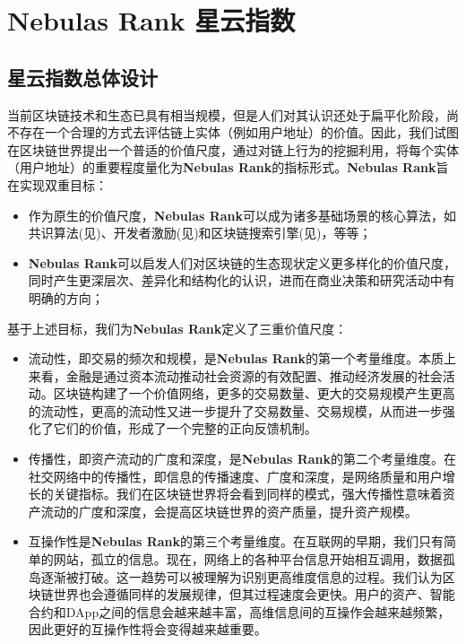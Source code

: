 \section{Nebulas Rank 星云指数}
\label{sec:rank}

\subsection{星云指数总体设计} \label{subsec:value}
当前区块链技术和生态已具有相当规模，但是人们对其认识还处于扁平化阶段，尚不存在一个合理的方式去评估链上实体（例如用户地址）的价值。因此，我们试图在区块链世界提出⼀个普适的价值尺度，通过对链上行为的挖掘利用，将每个实体（用户地址）的重要程度量化为\textbf{Nebulas Rank}的指标形式。\textbf{Nebulas Rank}旨在实现双重目标：
\begin{itemize}
	\item 作为原生的价值尺度，\textbf{Nebulas Rank}可以成为诸多基础场景的核心算法，如共识算法(见)、开发者激励(见)和区块链搜索引擎(见)，等等；
	\item \textbf{Nebulas Rank}可以启发人们对区块链的生态现状定义更多样化的价值尺度，同时产生更深层次、差异化和结构化的认识，进而在商业决策和研究活动中有明确的方向；
\end{itemize}
基于上述目标，我们为\textbf{Nebulas Rank}定义了三重价值尺度：
\begin{itemize}
	\item 流动性，即交易的频次和规模，是\textbf{Nebulas Rank}的第⼀个考量维度。本质上来看，⾦融是通过资本流动推动社会资源的有效配置、推动经济发展的社会活动。区块链构建了⼀个价值⽹络，更多的交易数量、更⼤的交易规模产⽣更⾼的流动性，更⾼的流动性⼜进⼀步提升了交易数量、交易规模，从⽽进⼀步强化了它们的价值，形成了⼀个完整的正向反馈机制。
	\item 传播性，即资产流动的⼴度和深度，是\textbf{Nebulas Rank}的第⼆个考量维度。在社交网络中的传播性，即信息的传播速度、⼴度和深度，是⽹络质量和⽤户增长的关键指标。我们在区块链世界将会看到同样的模式，强⼤传播性意味着资产流动的⼴度和深度，会提⾼区块链世界的资产质量，提升资产规模。
	\item 互操作性是\textbf{Nebulas Rank}的第三个考量维度。在互联⽹的早期，我们只有简单的⽹站，孤⽴的信息。现在，⽹络上的各种平台信息开始相互调⽤，数据孤岛逐渐被打破。这⼀趋势可以被理解为识别更⾼维度信息的过程。我们认为区块链世界也会遵循同样的发展规律，但其过程速度会更快。⽤户的资产、智能合约和DApp之间的信息会越来越丰富，⾼维信息间的互操作会越来越频繁，因此更好的互操作性将会变得越来越重要。
\end{itemize}

